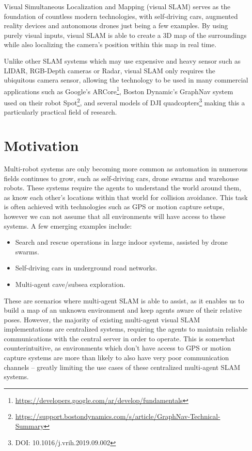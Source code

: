 
\label{sec:introduction}
Visual Simultaneous Localization and Mapping (visual SLAM) serves as the foundation of countless modern technologies, with self-driving cars, augmented reality devices and autonomous drones just being a few examples. By using purely visual inputs, visual SLAM is able to create a 3D map of the surroundings while also localizing the camera's position within this map in real time.

Unlike other SLAM systems which may use expensive and heavy sensor such as LIDAR, RGB-Depth cameras or Radar, visual SLAM only requires the ubiquitous camera sensor, allowing the technology to be used in many commercial applications such as Google's ARCore\footnote[1]{\url{https://developers.google.com/ar/develop/fundamentals}}, Boston Dynamic's GraphNav system used on their robot Spot\footnote[2]{\url{https://support.bostondynamics.com/s/article/GraphNav-Technical-Summary}}, and several models of DJI quadcopters\footnote[3]{DOI: 10.1016/j.vrih.2019.09.002} making this a particularly practical field of research.

\section{Motivation}
\label{sec:motivation}
Multi-robot systems are only becoming more common as automation in numerous fields continues to grow, such as self-driving cars, drone swarms and warehouse robots. These systems require the agents to understand the world around them, as know each other's locations within that world for collision avoidance. This task is often achieved with technologies such as GPS or motion capture setups, however we can not assume that all environments will have access to these systems. A few emerging examples include: \noparskip
\smallbreak

{
    \begin{itemize}[nosep]
        \item Search and rescue operations in large indoor systems, assisted by drone swarms.
        \item Self-driving cars in underground road networks.
        \item Multi-agent cave/subsea exploration.
    \end{itemize}
}

These are scenarios where multi-agent SLAM is able to assist, as it enables us to build a map of an unknown environment and keep agents aware of their relative poses. However, the majority of existing multi-agent visual SLAM implementations are centralized systems, requiring the agents to maintain reliable communications with the central server in order to operate. This is somewhat counterintuitive, as environments which don't have access to GPS or motion capture systems are more than likely to also have very poor communication channels -- greatly limiting the use cases of these centralized multi-agent SLAM systems.

